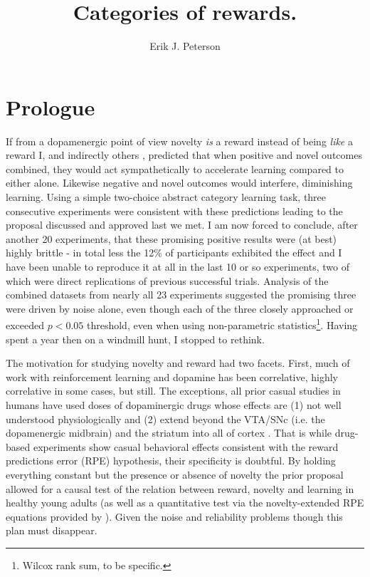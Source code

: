 \documentclass[doc,12pt]{apa}        %
\title{Categories of rewards.}
\author{Erik J. Peterson} \affiliation{Dept. of Psychology \\ Colorado State University \\ Fort Collins, CO}
\begin{document}
 
\maketitle

\section{Prologue} %
\label{sec:prologue}
If from a dopamenergic point of view novelty \emph{is} a reward instead of being \emph{like} a reward I, and indirectly others \cite{Kakade:2002p6414}, predicted that when positive and novel outcomes combined, they would act sympathetically to accelerate learning compared to either alone.  Likewise negative and novel outcomes would interfere, diminishing learning.  Using a simple two-choice abstract category learning task, three consecutive experiments were consistent with these predictions leading to the proposal discussed and approved last we met.  I am now forced to conclude, after another 20 experiments, that these promising positive results were (at best) highly brittle - in total less the 12\% of participants exhibited the effect and I have been unable to reproduce it at all in the last 10 or so experiments, two of which were direct replications of previous successful trials.  Analysis of the combined datasets from nearly all 23 experiments suggested the promising three were driven by noise alone, even though each of the three closely approached or exceeded $p < 0.05$ threshold, even when using non-parametric statistics\footnote{Wilcox rank sum, to be specific.}.  Having spent a year then on a windmill hunt, I stopped to rethink. 

The motivation for studying novelty and reward had two facets.  First, much of work with reinforcement learning and dopamine has been correlative, highly correlative in some cases, but still.  The exceptions, all prior casual studies in humans have used doses of dopaminergic drugs whose effects are (1) not well understood physiologically and (2) extend beyond the VTA/SNc (i.e. the dopamenergic midbrain) and the striatum into all of cortex \cite{Menon:2007p6529,Pizzagalli:2008p6521,Schonberg:2009p6669}.  That is while drug-based experiments show casual behavioral effects consistent with the reward predictions error (RPE) hypothesis, their specificity is doubtful.  By holding everything constant but the presence or absence of novelty the prior proposal allowed for a causal test of the relation between reward, novelty and learning in healthy young adults (as well as a quantitative test via the novelty-extended RPE equations provided by ).  Given the noise and reliability problems though this plan must disappear.  
\end{document}
